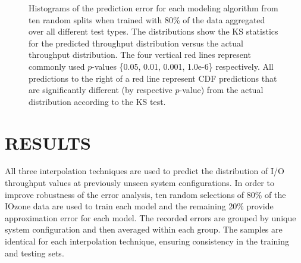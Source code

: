\documentclass[letterpaper, 10 pt, conference]{ieeeconf}  %
\begin{document}
\begin{figure}
  \caption{Histograms of the prediction error for each modeling algorithm from ten random splits when trained with 80\% of the data aggregated over all different test types. The distributions show the KS statistics for the predicted throughput distribution versus the actual throughput distribution. The four vertical red lines represent commonly used $p$-values \{0.05, 0.01, 0.001, 1.0e-6\} respectively. All predictions to the right of a red line represent CDF predictions that are significantly different (by respective $p$-value) from the actual distribution according to the KS test.
  \vspace{-.1cm}}
  \label{fig:ks_histogram_80_20}
\end{figure}

\section{RESULTS}
\label{sec:results}

All three interpolation techniques are used to predict the distribution of I/O throughput values at previously unseen system configurations. In order to improve robustness of the error analysis, ten random selections of 80\% of the IOzone data are used to train each model and the remaining 20\% provide approximation error for each model. The recorded errors are grouped by unique system configuration and then averaged within each group. The samples are identical for each interpolation technique, ensuring consistency in the training and testing sets.
\end{document}
